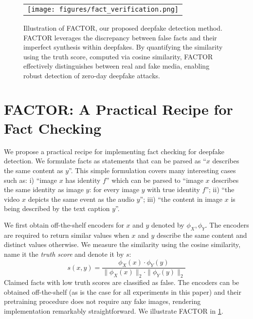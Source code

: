 \documentclass{article} \usepackage{iclr2024_conference,times}
\begin{document}
\begin{figure}[t]
  \begin{center}
    \begin{tabular}{c}
    \texttt{[image: figures/fact\_verification.png]} 
    \end{tabular}
  \end{center}
  \vspace{-0.75em}
    \caption{Illustration of FACTOR, our proposed deepfake detection method. FACTOR leverages the discrepancy between false facts and their imperfect synthesis within deepfakes. By quantifying the similarity using the truth score, computed via cosine similarity, FACTOR effectively distinguishes between real and fake media, enabling robust detection of zero-day deepfake attacks.}
    \label{fig:factor}
\end{figure}


\section{FACTOR: A Practical Recipe for Fact Checking}
\label{sec:framework}

We propose a practical recipe for implementing fact checking for deepfake detection. We formulate facts as statements that can be parsed as “$x$ describes the same content as $y$”. This simple formulation covers many interesting cases such as: i) “image $x$ has identity $f$” which can be parsed to “image $x$ describes the same identity as image $y$: for every image $y$ with true identity $f$”; ii) “the video $x$ depicts the same event as the audio $y$”; iii) “the content in image $x$ is being described by the text caption $y$”.    

We first obtain off-the-shelf encoders for $x$ and $y$ denoted by $\phi_X, \phi_Y$. The encoders are required to return similar values when $x$ and $y$ describe the same content and distinct values otherwise. We measure the similarity using the cosine similarity, name it the \textit{truth score} and denote it by $s$:
\begin{equation}
s(x,y) = \frac{\phi_X(x) \cdot \phi_Y(y)}{\|\phi_X(x)\|_2 \cdot \|\phi_Y(y)\|_2}
\end{equation}
Claimed facts with low truth scores are classified as false. The encoders can be obtained off-the-shelf (as is the case for all experiments in this paper) and their pretraining procedure does not require any fake images, rendering implementation remarkably straightforward. We illustrate FACTOR in \cref{fig:factor}.
\end{document}
